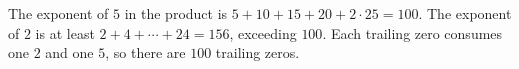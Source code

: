 The exponent of $5$ in the product is $5+10+15+20+2\cdot25=100$. The exponent of $2$ is at least $2+4+\cdots+24=156$, exceeding $100$. Each trailing zero consumes one $2$ and one $5$, so there are $\boxed{100}$ trailing zeros.

